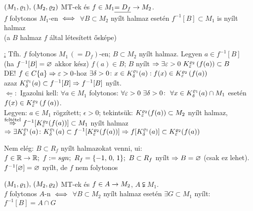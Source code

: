 \begin{te}
  $(M_1,\varrho_1),\,(M_2,\varrho_2)$ MT-ek és $f\in M_1 \underline{=D_f}\to
  M_2$.\\
  $f$ folytonos $M_1$-en $\iff$ $\forall B\subset M_2$ nyílt
  halmaz esetén $f^{-1}[B]\subset M_1$ is nyílt halmaz\\
  (a $B$ halmaz $f$ által létesített ősképe)
\end{te}
\begin{biz}
  \underline{\nn:} Tfh. $f$ folytonos $M_1\,(=D_f)$-en; $B\subset
  M_2$ nyílt halmaz. Legyen  $a\in f^{-1}[B]$ (ha $f^{-1}[B]=\varnothing$
  akkor kész)
  \nn $f(a) \in B$; $B$ nyílt $\Rightarrow \exists \varepsilon>0\
  K_\varepsilon^{\varrho_2} \left(f(a)\right)\subset B$\\
  DE! $f\in C\{a\}\Rightarrow \varepsilon>0$-hoz $\exists\delta>0\colon x\in
  K_\delta^{\varrho_1}(a): f(x) \in K_\varepsilon^{\varrho_2}
  \left(f(a)\right)$\\
  azaz $K_\delta^{\varrho_1}(a)\subset f^{-1}[B]\Rightarrow
  f^{-1}[B]$ nyílt.\\
  $\underline{\Leftarrow:}$ Igazolni kell: $\forall a \in M_1$
  folytonos: $\forall \varepsilon > 0\ \exists \delta > 0\colon\
  \forall x\in  K_\delta^{\varrho_1}(a)\cap M_1$ esetén\\
  $f(x)\in K_\varepsilon^{\varrho_2}\left(f\left(a\right)\right)$.\\
  Legyen: $a\in M_1$ rögzített; $\epsilon > 0$; tekintsük:
  $K_\varepsilon^{\varrho_2}(f(a))\subset M_2$ nyílt halmaz, 
  $\stackrel{\text{feltétel}}{\Rightarrow}\\f^{-1}[K_\varepsilon^{\varrho_2}(f(a))]
  \subset M_1$ nyílt halmaz $\Rightarrow \exists K_\delta^{\varrho_1}(a)\colon
  K_\delta^{\varrho_1}(a)\subset f^{-1}[K_\varepsilon^{\varrho_2}(f(a))] \Rightarrow\\
  f[K_\delta^{\varrho_1}(a)]\subset K_\varepsilon^{\varrho_2}(f(a)) $
\end{biz}

\begin{megj}
  Nem elég: $B\subset R_f$ nyílt halmazokat venni, ui: $f\in\mathbb{R}\to\mathbb{R}; 
  \ f := sgn;\ R_f = \{-1,\, 0,\, 1 \};\ B\subset R_f$ nyílt $\Rightarrow
  B=\varnothing$ (csak ez lehet). $f^{-1}[\varnothing] =\varnothing $ nyílt, de $f$
  nem folytonos
\end{megj}

\begin{te}[Általánosítás]
  $(M_1,\varrho_1),\,(M_2,\varrho_2)$ MT-ek és $f\in A\to M_2$, $A\subsetneqq
  M_1$.\\ 
  $f$ folytonos $A$-n $\iff$ $\forall B\subset M_2$ nyílt
  halmaz esetén $\exists G\subset M_1$ nyílt: $f^{-1}[B]= A\cap G$ 
\end{te}

